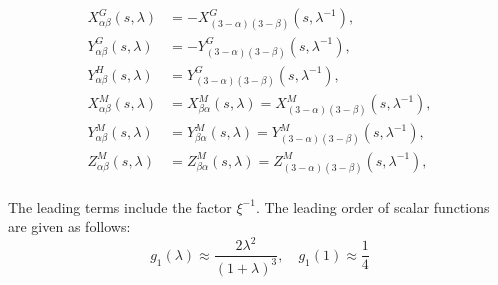 \documentclass[11pt]{scrartcl}
\begin{document}
\begin{align}
 X_{\alpha\beta}^{G} (s,\lambda)
& =
- X_{(3-\alpha)(3-\beta)}^{G} (s,\lambda^{-1}), \\
 Y_{\alpha\beta}^{G} (s,\lambda)
& =
- Y_{(3-\alpha)(3-\beta)}^{G} (s,\lambda^{-1}), \\
 Y_{\alpha\beta}^{H} (s,\lambda)
& =
 Y_{(3-\alpha)(3-\beta)}^{G} (s,\lambda^{-1}), \\
 X_{\alpha\beta}^{M} (s,\lambda)
& =
 X_{\beta\alpha}^{M} (s,\lambda)
 =
 X_{(3-\alpha)(3-\beta)}^{M} (s,\lambda^{-1}), \\
 Y_{\alpha\beta}^{M} (s,\lambda)
& =
 Y_{\beta\alpha}^{M} (s,\lambda)
 =
 Y_{(3-\alpha)(3-\beta)}^{M} (s,\lambda^{-1}), \\
 Z_{\alpha\beta}^{M} (s,\lambda)
& =
 Z_{\beta\alpha}^{M} (s,\lambda)
 =
 Z_{(3-\alpha)(3-\beta)}^{M} (s,\lambda^{-1}), \\
\end{align}


The leading terms include the factor $\xi^{-1}$.
%
The leading order of scalar functions are given as follows:
%
\begin{equation*}
 g_1 (\lambda)
\approx \frac{2\lambda^2}{(1+\lambda)^3},
\quad  g_1 (1) \approx \frac{1}{4}
\end{equation*}
\end{document}
